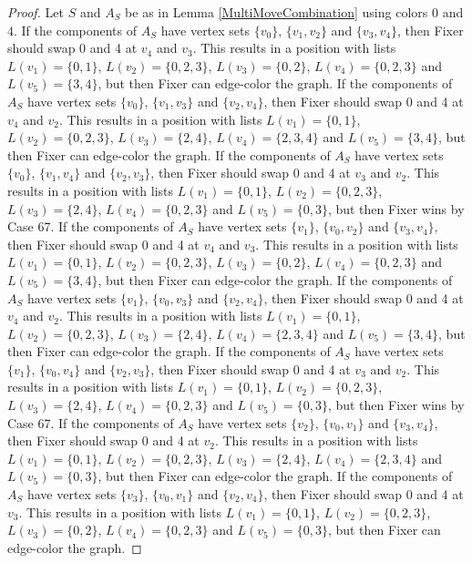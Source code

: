 \documentclass[12pt]{amsart}
\theoremstyle{plain}
\theoremstyle{definition}
\theoremstyle{remark}
\begin{document}
\begin{proof}
Let $S$ and $A_S$ be as in Lemma \ref{MultiMoveCombination} using colors $0$ and $4$. If the components of $A_S$ have vertex sets $\{v_0\}$, $\{v_1, v_2\}$ and $\{v_3, v_4\}$, then Fixer should swap 0 and 4 at $v_4$ and $v_3$. This results in a position with lists $L(v_1) = \{0, 1\}$, $L(v_2) = \{0, 2, 3\}$, $L(v_3) = \{0, 2\}$, $L(v_4) = \{0, 2, 3\}$ and $L(v_5) = \{3, 4\}$, but then Fixer can edge-color the graph.
If the components of $A_S$ have vertex sets $\{v_0\}$, $\{v_1, v_3\}$ and $\{v_2, v_4\}$, then Fixer should swap 0 and 4 at $v_4$ and $v_2$. This results in a position with lists $L(v_1) = \{0, 1\}$, $L(v_2) = \{0, 2, 3\}$, $L(v_3) = \{2, 4\}$, $L(v_4) = \{2, 3, 4\}$ and $L(v_5) = \{3, 4\}$, but then Fixer can edge-color the graph.
If the components of $A_S$ have vertex sets $\{v_0\}$, $\{v_1, v_4\}$ and $\{v_2, v_3\}$, then Fixer should swap 0 and 4 at $v_3$ and $v_2$. This results in a position with lists $L(v_1) = \{0, 1\}$, $L(v_2) = \{0, 2, 3\}$, $L(v_3) = \{2, 4\}$, $L(v_4) = \{0, 2, 3\}$ and $L(v_5) = \{0, 3\}$, but then Fixer wins by Case 67.
If the components of $A_S$ have vertex sets $\{v_1\}$, $\{v_0, v_2\}$ and $\{v_3, v_4\}$, then Fixer should swap 0 and 4 at $v_4$ and $v_3$. This results in a position with lists $L(v_1) = \{0, 1\}$, $L(v_2) = \{0, 2, 3\}$, $L(v_3) = \{0, 2\}$, $L(v_4) = \{0, 2, 3\}$ and $L(v_5) = \{3, 4\}$, but then Fixer can edge-color the graph.
If the components of $A_S$ have vertex sets $\{v_1\}$, $\{v_0, v_3\}$ and $\{v_2, v_4\}$, then Fixer should swap 0 and 4 at $v_4$ and $v_2$. This results in a position with lists $L(v_1) = \{0, 1\}$, $L(v_2) = \{0, 2, 3\}$, $L(v_3) = \{2, 4\}$, $L(v_4) = \{2, 3, 4\}$ and $L(v_5) = \{3, 4\}$, but then Fixer can edge-color the graph.
If the components of $A_S$ have vertex sets $\{v_1\}$, $\{v_0, v_4\}$ and $\{v_2, v_3\}$, then Fixer should swap 0 and 4 at $v_3$ and $v_2$. This results in a position with lists $L(v_1) = \{0, 1\}$, $L(v_2) = \{0, 2, 3\}$, $L(v_3) = \{2, 4\}$, $L(v_4) = \{0, 2, 3\}$ and $L(v_5) = \{0, 3\}$, but then Fixer wins by Case 67.
If the components of $A_S$ have vertex sets $\{v_2\}$, $\{v_0, v_1\}$ and $\{v_3, v_4\}$, then Fixer should swap 0 and 4 at $v_2$. This results in a position with lists $L(v_1) = \{0, 1\}$, $L(v_2) = \{0, 2, 3\}$, $L(v_3) = \{2, 4\}$, $L(v_4) = \{2, 3, 4\}$ and $L(v_5) = \{0, 3\}$, but then Fixer can edge-color the graph.
If the components of $A_S$ have vertex sets $\{v_3\}$, $\{v_0, v_1\}$ and $\{v_2, v_4\}$, then Fixer should swap 0 and 4 at $v_3$. This results in a position with lists $L(v_1) = \{0, 1\}$, $L(v_2) = \{0, 2, 3\}$, $L(v_3) = \{0, 2\}$, $L(v_4) = \{0, 2, 3\}$ and $L(v_5) = \{0, 3\}$, but then Fixer can edge-color the graph.

\end{proof}
\end{document}
